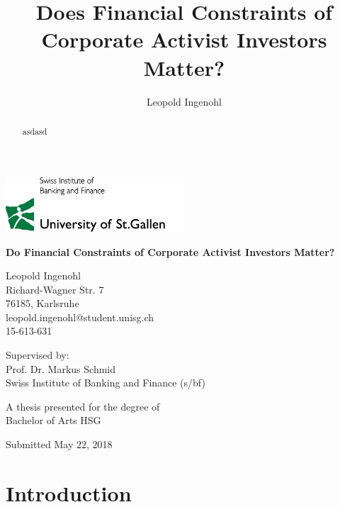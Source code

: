 \documentclass[12pt]{article}
\title{Does Financial Constraints of Corporate Activist Investors Matter?}
\author{Leopold Ingenohl}
\newcounter{savepage}
\begin{document}
\begin{titlepage}
    \begin{center}
       
        \includegraphics[width=0.5\textwidth]{Logo.jpg}
       
        \vspace*{1.5cm}
		\huge
        \textbf{Do Financial Constraints of Corporate Activist Investors Matter?}

        \vspace{1.5cm}
		\normalsize
        Leopold Ingenohl\\
        Richard-Wagner Str. 7\\
        76185, Karlsruhe\\
        leopold.ingenohl@student.unisg.ch\\
        15-613-631

        \vspace{1.5cm}
        Supervised by:\\
        Prof. Dr. Markus Schmid\\
        Swiss Institute of Banking and Finance (s/bf)\\
        \vfill

        A thesis presented for the degree of\\
        Bachelor of Arts HSG

        \vspace{0.8cm}

        Submitted May 22, 2018

	\end{center}
	
\end{titlepage}

\cleardoublepage
{}
\begin{abstract}
	asdasd
\end{abstract}

\pagebreak

\tableofcontents
\listoftables
\listoffigures

\cleardoublepage
{}

\section{Introduction}
\end{document}
